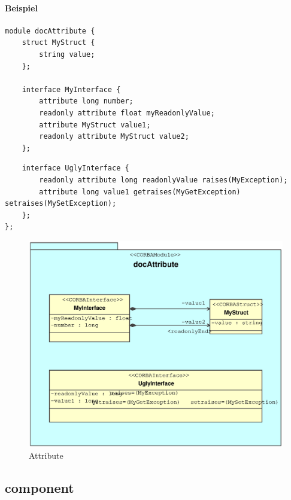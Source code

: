\documentclass [a4paper,10pt] {scrartcl}
\begin{document}
\paragraph{Beispiel}
\begin{verbatim}
module docAttribute {
    struct MyStruct {
        string value;
    };

    interface MyInterface {
        attribute long number;
        readonly attribute float myReadonlyValue;
        attribute MyStruct value1;
        readonly attribute MyStruct value2;
    };
\end{verbatim}
\newpage
\begin{verbatim}
    interface UglyInterface {
        readonly attribute long readonlyValue raises(MyException);
        attribute long value1 getraises(MyGetException) setraises(MySetException);
    };
};
\end{verbatim}
\begin{figure}[!h]
\centerline{\includegraphics[width=\linewidth]{docAttribute.eps}}
\caption{Attribute}
\label{fig:attribute}
\end{figure}

\cleardoublepage
\subsection{component}
\end{document}
